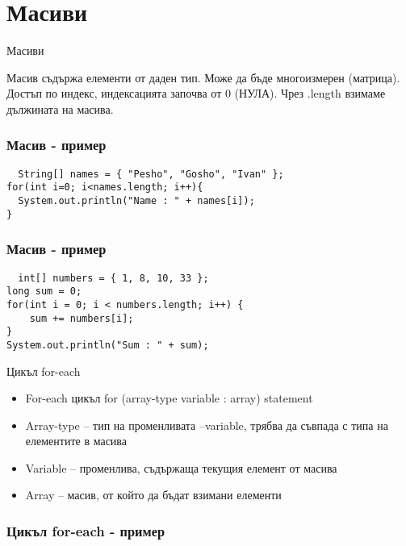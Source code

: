 \documentclass{beamer}
\begin{document}
\section{Масиви}


\begin{frame}{Масиви}
  \transdissolve
  \begin{block}{Масив}
    съдържа елементи от даден
    тип. Може да бъде многоизмерен
    (матрица). Достъп по индекс,
    индексацията започва от 0 (НУЛА).
    Чрез .length взимаме дължината на
    масива.
  \end{block}
\end{frame}

\begin{frame}[fragile]
  \frametitle{Масив - пример}
  \transdissolve
\begin{lstlisting}
  String[] names = { "Pesho", "Gosho", "Ivan" };
for(int i=0; i<names.length; i++){
  System.out.println("Name : " + names[i]);
}
\end{lstlisting}
\end{frame}

\begin{frame}[fragile]
  \frametitle{Масив - пример}
  \transdissolve
\begin{lstlisting}
  int[] numbers = { 1, 8, 10, 33 };
long sum = 0;
for(int i = 0; i < numbers.length; i++) {
    sum += numbers[i];
}
System.out.println("Sum : " + sum);
\end{lstlisting}
\end{frame}

\begin{frame}{Цикъл for-each}
  \transdissolve
  \begin{itemize}
  \item             For-each цикъл
    for (array-type variable : array) statement

    \item Array-type – тип на променливата
    –variable, трябва да съвпада с типа на
    елементите в масива
    \item Variable – променлива, съдържаща
    текущия елемент от масива
    \item Array – масив, от който да бъдат
    взимани елементи

  \end{itemize}
\end{frame}

\begin{frame}[fragile]
  \frametitle{Цикъл for-each - пример}
  \transdissolve
\begin{lstlisting}
  
\end{lstlisting}
\end{frame}
\end{document}
